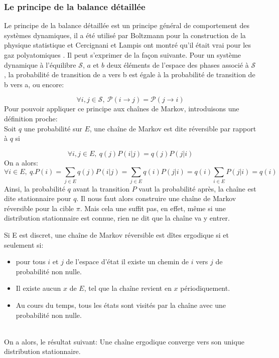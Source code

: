 \subsubsection{Le principe de la balance détaillée}

Le principe de la balance détaillée est un principe général de comportement des systèmes dynamiques, il a été utilisé par Boltzmann pour la construction de la physique statistique et Cercignani et Lampis ont montré qu'il était vrai pour les gaz polyatomiques \cite{Cercignani81}. Il peut s'exprimer de la façon suivante. Pour un système dynamique à l'équilibre $\mathcal{S}$, $a$ et $b$ deux éléments de l'espace des phases associé à $\mathcal{S}$, la probabilité de transition de a vers b est égale à la probabilité de transition de b vers a, ou encore: 

\begin{equation}
\forall i,j \in \mathcal{S},\ \mathcal{P}(i \rightarrow j) = \mathcal{P}(j \rightarrow i) 
\end{equation}
Pour pouvoir appliquer ce principe aux chaînes de Markov, introduisons une définition proche:\\
Soit $q$ une probabilité sur $E$, une chaîne de Markov est dite réversible par rapport à $q$ si

\begin{equation}
\forall i,j \in E,\ q(j)P(i|j)=q(j)P(j|i)
\end{equation}
On a alors:
\begin{equation}
\forall i \in E,\ q.P (i) = \sum_{j \in E} q(j)P(i|j) = \sum_{j \in E} q(i)P(j|i) = q(i) \sum_{i \in E}P(j|i) = q(i)
\end{equation}
Ainsi, la probabilité $q$ avant la transition $P$ vaut la probabilité après, la chaîne est dite stationnaire pour $q$. Il nous faut alors construire une chaîne de Markov réversible pour la cible $\pi$. Mais cela une suffit pas, en effet, même si une distribution stationnaire est connue, rien ne dit que la chaîne va y entrer. 

Si E est discret, une chaîne de Markov réversible est dîtes ergodique si et seulement si:

\begin{itemize}
\item pour tous $i$ et $j$ de l'espace d'état il existe un chemin de $i$  vers $j$  de probabilité non nulle. 
\item Il existe aucun $x$ de $E$, tel que la chaîne revient en $x$ périodiquement.
\item  Au cours du temps, tous les états sont visités par la chaîne avec une probabilité non nulle. 
\end{itemize}\\
On a alors, le résultat suivant:
Une chaîne ergodique converge vers son unique distribution stationnaire.

